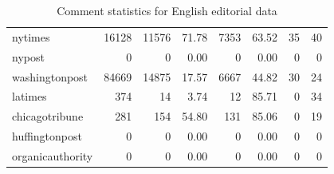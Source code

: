 \begin{table}
\begin{tabular}{lrrrrrrr}
		nytimes          &          16128 &             11576 &         71.78 &       7353 &         63.52 &            35 &                40 \\
		nypost           &              0 &                 0 &          0.00 &          0 &          0.00 &             0 &                 0 \\
		washingtonpost   &          84669 &             14875 &         17.57 &       6667 &         44.82 &            30 &                24 \\
		latimes          &            374 &                14 &          3.74 &         12 &         85.71 &             0 &                34 \\
		chicagotribune   &            281 &               154 &         54.80 &        131 &         85.06 &             0 &                19 \\
		huffingtonpost   &              0 &                 0 &          0.00 &          0 &          0.00 &             0 &                 0 \\
		organicauthority &              0 &                 0 &          0.00 &          0 &          0.00 &             0 &                 0 \\ \bottomrule
	\end{tabular}
	
	\caption{Comment statistics for English editorial data} 
\end{table}


